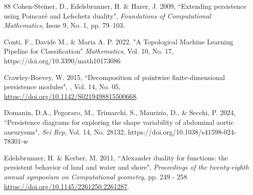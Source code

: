 \documentclass[a4paper,11pt]{article}
\theoremstyle{definition}
\begin{document}
\begin{thebibliography}{88}
 Cohen-Steiner, D., Edelsbrunner, H. \& Harer, J. 2009, ``Extending persistence using Poincar\'{e} and Lefschetz duality", \textit{Foundations of Computational Mathematics}, Issue 9, No. 1, pp. 79–103.

Conti, F., Davide M., \& Maria A. P. 2022. "A Topological Machine Learning Pipeline for Classification" \textit{Mathematics}, Vol. 10, No. 17, https://doi.org/10.3390/math10173086 

Crawley-Boevey, W. 2015,
\newblock ``Decomposition of pointwise finite-dimensional persistence modules",
, Vol. 14, No. 05, \url{https://doi.org/10.1142/S0219498815500668}.

 
 

  Domanin, D.A., Pegoraro, M., Trimarchi, S., Maurizio, D., \& Secchi, P. 2024, ``Persistence diagrams for exploring the shape variability of abdominal aortic aneurysms", \textit{Sci Rep}, Vol. 14, No. 28132, https://doi.org/10.1038/s41598-024-78301-w


  Edelsbrunner, H. \& Kerber, M. 2011, ``Alexander duality for functions: the persistent behavior of land and water and shore", \textit{Proceedings of the twenty-eighth annual symposium on Computational geometry}, pp. 249 - 258 \url{https://doi.org/10.1145/2261250.2261287}.





\end{thebibliography}
\end{document}
